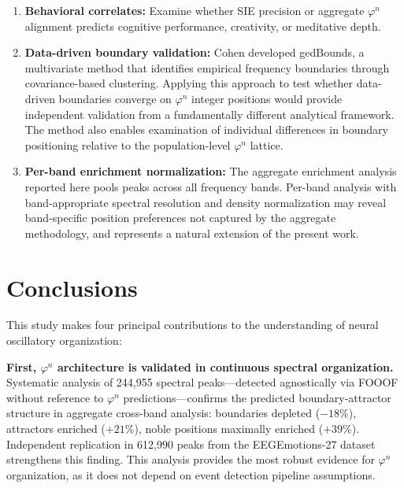 \documentclass[11pt,a4paper]{article}
\newcommand{\phisym}{\varphi}
\begin{document}
\begin{enumerate}
    \item \textbf{Behavioral correlates:} Examine whether SIE precision or aggregate $\phisym^n$ alignment predicts cognitive performance, creativity, or meditative depth.

    \item \textbf{Data-driven boundary validation:} Cohen \parencite{cohen2021gedbounds} developed gedBounds, a multivariate method that identifies empirical frequency boundaries through covariance-based clustering. Applying this approach to test whether data-driven boundaries converge on $\phisym^n$ integer positions would provide independent validation from a fundamentally different analytical framework. The method also enables examination of individual differences in boundary positioning relative to the population-level $\phisym^n$ lattice.

    \item \textbf{Per-band enrichment normalization:} The aggregate enrichment analysis reported here pools peaks across all frequency bands. Per-band analysis with band-appropriate spectral resolution and density normalization may reveal band-specific position preferences not captured by the aggregate methodology, and represents a natural extension of the present work.
\end{enumerate}

\section{Conclusions}

This study makes four principal contributions to the understanding of neural oscillatory organization:

\textbf{First, $\phisym^n$ architecture is validated in continuous spectral organization.} Systematic analysis of 244,955 spectral peaks---detected agnostically via FOOOF without reference to $\phisym^n$ predictions---confirms the predicted boundary-attractor structure in aggregate cross-band analysis: boundaries depleted ($-18\%$), attractors enriched ($+21\%$), noble positions maximally enriched ($+39\%$). Independent replication in 612,990 peaks from the EEGEmotions-27 dataset strengthens this finding. This analysis provides the most robust evidence for $\phisym^n$ organization, as it does not depend on event detection pipeline assumptions.
\end{document}
